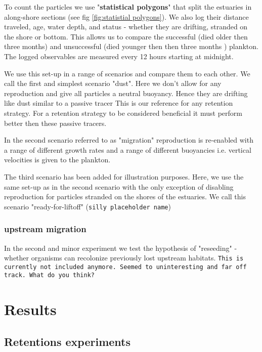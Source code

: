 To count the particles we use "\textbf{statistical polygons}" that split the estuaries in along-shore sections (see fig  \ref{fig:statistial polygons}).
We also log their distance traveled, age, water depth, and status - whether they are drifting, stranded on the shore or bottom.
This allows us to compare the successful (died older then three months) and unsuccessful (died younger then then three months ) plankton.
The logged observables are measured every 12 hours starting at midnight.
\medskip

We use this set-up in a range of scenarios and compare them to each other.
We call the first and simplest scenario "dust". 
Here we don't allow for any reproduction and give all particles a neutral buoyancy.
Hence they are drifting like dust similar to a passive tracer
This is our reference for any retention strategy. 
For a retention strategy to be considered beneficial it must perform better then these passive tracers.

In the second scenario referred to as "migration" reproduction is re-enabled with a range of different growth rates 
and a range of different buoyancies i.e. vertical velocities is given to the plankton.

The third scenario has been added for illustration purposes.
Here, we use the same set-up as in the second scenario with the only exception of disabling reproduction for particles stranded on the shores of the estuaries.
We call this scenario "ready-for-liftoff" (\texttt{silly placeholder name})
\label{txt:ready-for-liftoff}

\subsubsection*{upstream migration}

In the second and minor experiment we test the hypothesis of "reseeding" - whether organisms can recolonize previously lost upstream habitats.
\texttt{This is currently not included anymore. Seemed to uninteresting and far off track. What do you think?}


\section*{Results}

\subsection*{Retentions experiments}

